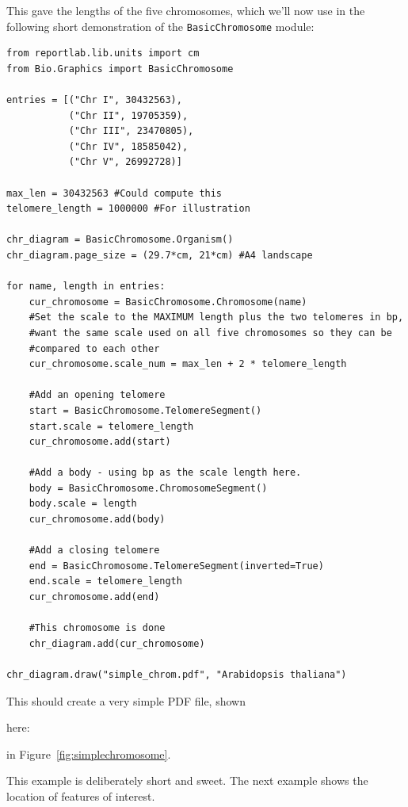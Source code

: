 \documentclass{report}
\begin{document}
\noindent This gave the lengths of the five chromosomes, which we'll now use in
the following short demonstration of the \verb|BasicChromosome| module:

\begin{verbatim}
from reportlab.lib.units import cm
from Bio.Graphics import BasicChromosome

entries = [("Chr I", 30432563),
           ("Chr II", 19705359),
           ("Chr III", 23470805),
           ("Chr IV", 18585042),
           ("Chr V", 26992728)]

max_len = 30432563 #Could compute this
telomere_length = 1000000 #For illustration
         
chr_diagram = BasicChromosome.Organism()
chr_diagram.page_size = (29.7*cm, 21*cm) #A4 landscape

for name, length in entries:
    cur_chromosome = BasicChromosome.Chromosome(name)
    #Set the scale to the MAXIMUM length plus the two telomeres in bp,
    #want the same scale used on all five chromosomes so they can be
    #compared to each other
    cur_chromosome.scale_num = max_len + 2 * telomere_length

    #Add an opening telomere
    start = BasicChromosome.TelomereSegment()
    start.scale = telomere_length
    cur_chromosome.add(start)

    #Add a body - using bp as the scale length here.
    body = BasicChromosome.ChromosomeSegment()
    body.scale = length
    cur_chromosome.add(body)

    #Add a closing telomere
    end = BasicChromosome.TelomereSegment(inverted=True)
    end.scale = telomere_length
    cur_chromosome.add(end)

    #This chromosome is done
    chr_diagram.add(cur_chromosome)

chr_diagram.draw("simple_chrom.pdf", "Arabidopsis thaliana")
\end{verbatim}

This should create a very simple PDF file, shown
\begin{htmlonly}
here:


\end{htmlonly}
\begin{latexonly}
in Figure~\ref{fig:simplechromosome}.
\end{latexonly}
This example is deliberately short and sweet. The next example shows the
location of features of interest.
\end{document}

